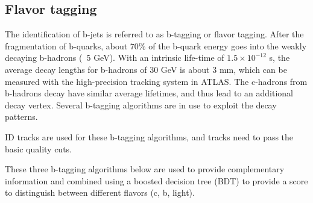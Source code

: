 \subsection{Flavor tagging}
\label{sec:track}

\par The identification of b-jets is referred to as b-tagging or flavor tagging. After the fragmentation of b-quarks, about 70\% of the b-quark energy goes into the weakly decaying b-hadrons (~5 GeV). With an intrinsic life-time of $1.5 \times 10^{−12}$ s, the average decay lengths for b-hadrons of 30 GeV is about 3 mm, which can be measured with the high-precision tracking system in ATLAS.
The c-hadrons from b-hadrons decay have similar average lifetimes, and thus lead to an additional decay vertex. 
Several b-tagging algorithms are in use to exploit the decay patterns. 				
\par ID tracks are used for these b-tagging algorithms, and tracks need to pass the basic quality cuts. 		
\par These three b-tagging algorithms below are used to provide complementary information and combined using a boosted decision tree (BDT) to provide a score to distinguish between different flavors (c, b, light). 	

